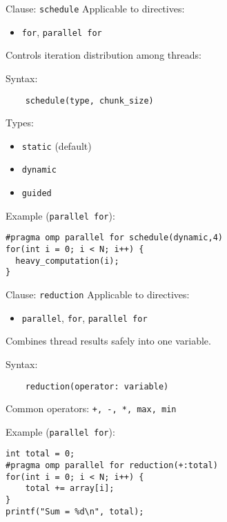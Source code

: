 \documentclass{beamer}
\begin{document}
\begin{frame}[fragile]{Clause: \texttt{schedule}}
  Applicable to directives:
  \begin{itemize}
    \item \texttt{for}, \texttt{parallel for}
  \end{itemize}

  Controls iteration distribution among threads:

  Syntax:
  \begin{verbatim}
    schedule(type, chunk_size)
  \end{verbatim}

  Types:
  \begin{itemize}
    \item \texttt{static} (default)
    \item \texttt{dynamic}
    \item \texttt{guided}
  \end{itemize}

  Example (\texttt{parallel for}):
  \lstset{style=CStyle}
  \begin{lstlisting}
#pragma omp parallel for schedule(dynamic,4)
for(int i = 0; i < N; i++) {
  heavy_computation(i);
}
  \end{lstlisting}
\end{frame}

\begin{frame}[fragile]{Clause: \texttt{reduction}}
  Applicable to directives:
  \begin{itemize}
    \item \texttt{parallel}, \texttt{for}, \texttt{parallel for}
  \end{itemize}

  Combines thread results safely into one variable.

  Syntax:
  \begin{verbatim}
    reduction(operator: variable)
  \end{verbatim}

  Common operators: \texttt{+, -, *, max, min}

  Example (\texttt{parallel for}):
  \lstset{style=CStyle}
  \begin{lstlisting}
int total = 0;
#pragma omp parallel for reduction(+:total)
for(int i = 0; i < N; i++) {
    total += array[i];
}
printf("Sum = %d\n", total);
  \end{lstlisting}
\end{frame}
\end{document}
